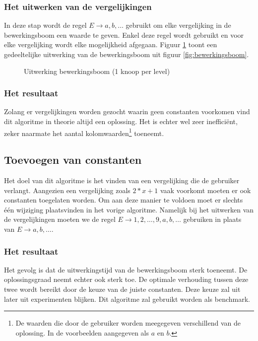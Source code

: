 \documentclass[Main.tex]{subfiles}
\begin{document}
\subsubsection*{Het uitwerken van de vergelijkingen}
In deze stap wordt de regel $E \rightarrow a,b,\dotsc$ gebruikt om elke vergelijking in de bewerkingsboom een waarde te geven. Enkel deze regel wordt gebruikt en voor elke vergelijking wordt elke mogelijkheid afgegaan. Figuur \ref{fig:uitwerkingsboom} toont een gedeeltelijke uitwerking van de bewerkingsboom uit figuur \ref{fig:bewerkingsboom}.
\begin{figure}[!htb]
\centering
{}
\caption{Uitwerking bewerkingsboom (1 knoop per level)} \label{fig:uitwerkingsboom}
\end{figure}
\subsubsection*{Het resultaat}
Zolang er vergelijkingen worden gezocht waarin geen constanten voorkomen vind dit algoritme in theorie altijd een oplossing. Het is echter wel zeer inefficiënt, zeker naarmate het aantal kolomwaarden\footnote{\label{note:kolomwaarden} De waarden die door de gebruiker worden meegegeven verschillend van de oplossing. In de voorbeelden aangegeven als $a$ en $b$.}
toeneemt.
\subsection{Toevoegen van constanten}
Het doel van dit algoritme is het vinden van een vergelijking die de gebruiker verlangt. Aangezien een vergelijking zoals $2 \ast x+1$ vaak voorkomt moeten er ook constanten toegelaten worden. Om aan deze manier te voldoen moet er slechts één wijziging plaatsvinden in het vorige algoritme. Namelijk bij het uitwerken van de vergelijkingen moeten we de regel $E \rightarrow 1,2,\dotsc,9,a,b,\dotsc$ gebruiken in plaats van $E \rightarrow a,b,\dotsc$.
\subsubsection*{Het resultaat}
Het gevolg is dat de uitwerkingstijd van de bewerkingsboom sterk toeneemt. De oplossingsgraad neemt echter ook sterk toe. De optimale verhouding tussen deze twee wordt bereikt door de keuze van de juiste constanten. Deze keuze zal uit later uit experimenten blijken. Dit algoritme zal gebruikt worden als benchmark.
\end{document}
